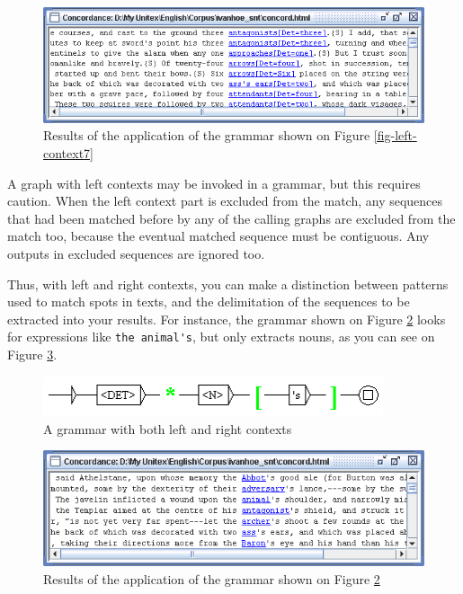 \begin{figure}[!ht]
\begin{center}
\includegraphics[width=15cm]{resources/img/fig6-17h.png}
\caption{Results of the application of the grammar shown on Figure
\ref{fig-left-context7}\label{fig-left-context8}}
\end{center}
\end{figure}

\bigskip
\noindent A graph with left contexts may be invoked in a grammar, but this requires caution.
When the left context part is excluded from the match, any sequences that had been matched before by 
any of the calling graphs are excluded from the match too, because the eventual matched sequence must be contiguous.
Any outputs in excluded sequences are ignored too.

\bigskip
\noindent Thus, with left and right contexts, you can make a distinction between
patterns used to match spots in texts, and the delimitation of the sequences to be extracted into your
results. For instance, the grammar shown on Figure \ref{fig-left-context9} looks
for expressions like \verb$the animal's$, but only extracts nouns, as you can
see on Figure \ref{fig-left-context10}.

\begin{figure}[!ht]
\begin{center}
\includegraphics[width=10cm]{resources/img/fig6-17i.png}
\caption{A grammar with both left and right contexts\label{fig-left-context9}}
\end{center}
\end{figure}

\begin{figure}[!ht]
\begin{center}
\includegraphics[width=15cm]{resources/img/fig6-17j.png}
\caption{Results of the application of the grammar shown on Figure
\ref{fig-left-context9}\label{fig-left-context10}}
\end{center}
\end{figure}


